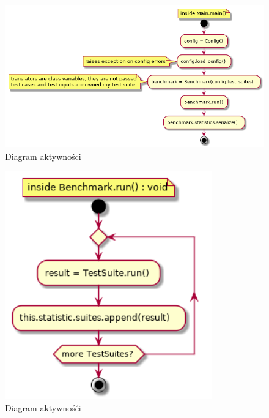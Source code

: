 \documentclass[a4paper,12pt]{article}
\begin{document}
\begin{figure}[H]
  \centering
  \includegraphics[width=\textwidth]{benchmark/activity_diagrams/main_run.png}
  \caption{Diagram aktywności}
\end{figure}

\begin{figure}[H]
  \centering
  \includegraphics[width=0.8\textwidth]{benchmark/activity_diagrams/benchmark_run.png}
  \caption{Diagram aktywnośći}
\end{figure}
\end{document}
